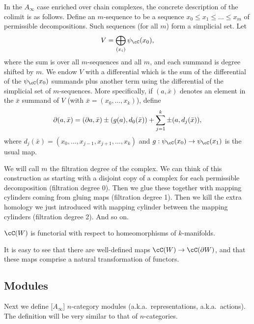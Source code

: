 In the $A_\infty$ case enriched over chain complexes, the concrete description of the colimit
is as follows.
Define an $m$-sequence to be a sequence $x_0 \le x_1 \le \dots \le x_m$ of permissible decompositions.
Such sequences (for all $m$) form a simplicial set.
Let
\[
	V = \bigoplus_{(x_i)} \psi_\cC(x_0) ,
\]
where the sum is over all $m$-sequences and all $m$, and each summand is degree shifted by $m$.
We endow $V$ with a differential which is the sum of the differential of the $\psi_\cC(x_0)$
summands plus another term using the differential of the simplicial set of $m$-sequences.
More specifically, if $(a, \bar{x})$ denotes an element in the $\bar{x}$
summand of $V$ (with $\bar{x} = (x_0,\dots,x_k)$), define
\[
	\partial (a, \bar{x}) = (\partial a, \bar{x}) \pm (g(a), d_0(\bar{x})) + \sum_{j=1}^k \pm (a, d_j(\bar{x})) ,
\]
where $d_j(\bar{x}) = (x_0,\dots,x_{j-1},x_{j+1},\dots,x_k)$ and $g: \psi_\cC(x_0)\to \psi_\cC(x_1)$
is the usual map.

We will call $m$ the filtration degree of the complex.
We can think of this construction as starting with a disjoint copy of a complex for each
permissible decomposition (filtration degree 0).
Then we glue these together with mapping cylinders coming from gluing maps
(filtration degree 1).
Then we kill the extra homology we just introduced with mapping cylinder between the mapping cylinders (filtration degree 2).
And so on.

$\cC(W)$ is functorial with respect to homeomorphisms of $k$-manifolds.

It is easy to see that
there are well-defined maps $\cC(W)\to\cC(\bd W)$, and that these maps
comprise a natural transformation of functors.




\subsection{Modules}

Next we define [$A_\infty$] $n$-category modules (a.k.a.\ representations,
a.k.a.\ actions).
The definition will be very similar to that of $n$-categories.

